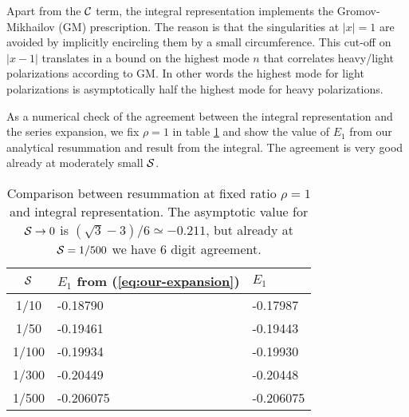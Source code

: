 Apart from the $\mathcal C$ term, the integral representation implements the Gromov-Mikhailov (GM) prescription. The reason is that the singularities at $|x|=1$ are avoided by implicitly encircling them by a small circumference. This cut-off on $|x-1|$ translates in a bound on the highest mode $n$ that correlates heavy/light polarizations according to GM. In other words the highest mode for light polarizations is asymptotically half the highest mode for heavy polarizations. 

As a numerical check of the agreement between the integral representation and the series expansion, 
we fix $\rho=1$ in table \ref{tab:check1} and show
the value of $E_{1}$ from our analytical resummation and result from the integral. The agreement is very good already 
at moderately small $\mathcal S$.

\begin{table}[htb]
\begin{center}
\begin{tabular}{c|ll}
$\mathcal S$ & $E_{1}$ from (\ref{eq:our-expansion}) & $E_{1}$ \\
\hline
1/10 & -0.18790 & -0.17987  \\
1/50 & -0.19461 & -0.19443 \\
1/100 & -0.19934 & -0.19930 \\
1/300 & -0.20449 & -0.20448 \\
1/500 & -0.206075 & -0.206075
\end{tabular}
\caption[Numerical comparison of integral representation and resummation]{Comparison between resummation at fixed ratio
$\rho=1$ and integral representation. The asymptotic value for $\mathcal S\to 0$ is $(\sqrt 3-3)/6\simeq -0.211$, but already at $\mathcal S = 1/500$ we have 6 digit agreement.
}
\label{tab:check1}
\end{center}
\end{table}



